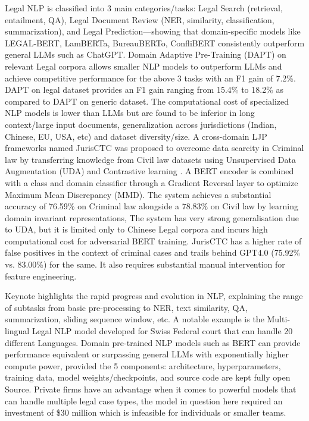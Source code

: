 Legal NLP is classified into 3 main categories/tasks: Legal Search (retrieval, entailment, QA), Legal Document Review (NER, similarity, classification, summarization), and Legal Prediction—showing that domain-specific models like LEGAL-BERT, LamBERTa, BureauBERTo, ConfliBERT consistently outperform general LLMs such as ChatGPT\cite{b13}. Domain Adaptive Pre-Training (DAPT) on relevant Legal corpora allows smaller NLP models to outperform LLMs and achieve competitive performance for the above 3 tasks with an F1 gain of 7.2\%.  DAPT on legal dataset provides an F1 gain ranging from 15.4\% to 18.2\% as compared to DAPT on generic dataset. The computational cost of specialized NLP models is lower than LLMs but are found to be inferior in long context/large input documents, generalization across jurisdictions (Indian, Chinese, EU, USA, etc) and dataset diversity/size.
A cross-domain LJP frameworks named JurisCTC was proposed to overcome data scarcity in Criminal law by transferring knowledge from Civil law datasets using Unsupervised Data Augmentation (UDA) and Contrastive learning \cite{b14}. A BERT encoder is combined with a class and domain classifier through a Gradient Reversal layer to optimize Maximum Mean Discrepancy (MMD). The system achieves a substantial accuracy of 76.59\% on Criminal law alongside a 78.83\% on Civil law by learning domain invariant representations, The system has very strong generalisation due to UDA, but it is limited only to Chinese Legal corpora and incurs high computational cost for adversarial BERT training. JurisCTC has a higher rate of false positives in the context of criminal cases and trails behind GPT4.0 (75.92\% vs. 83.00\%) for the same. It also requires substantial manual intervention for feature engineering.



Keynote highlights the rapid progress and evolution in NLP, explaining the range of subtasks from basic pre-processing to NER, text similarity, QA, summarization, sliding sequence window, etc. A notable example is the Multi-lingual Legal NLP model developed for Swiss Federal court that can handle 20 different Languages\cite{b15}. Domain pre-trained NLP models such as BERT can provide performance equivalent or surpassing general LLMs with exponentially higher compute power, provided the 5 components: architecture, hyperparameters, training data, model weights/checkpoints, and source code are kept fully open Source. Private firms have an advantage when it comes to powerful models that can handle multiple legal case types, the model in question here required an investment of \$30 million which is infeasible for individuals or smaller teams.



